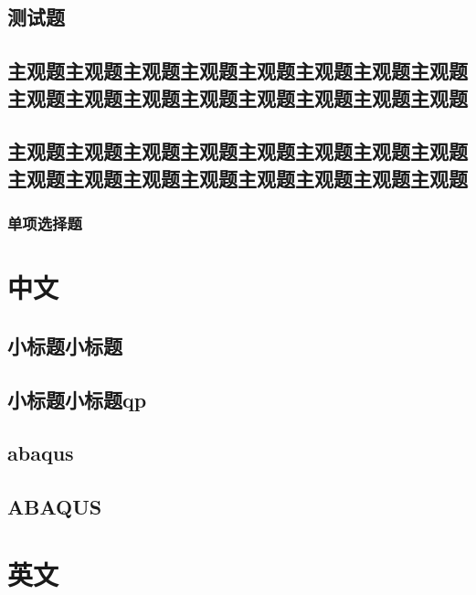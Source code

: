 \documentclass[color=green]{textbook-cn}%
\begin{document}
\begin{Test}
\chapter{测试题}


\begin{Definition}[定义名称]
	\lipsum[2]
\end{Definition}

\section{主观题主观题主观题主观题主观题主观题主观题主观题主观题主观题主观题主观题主观题主观题主观题主观题}


\section*{主观题主观题主观题主观题主观题主观题主观题主观题主观题主观题主观题主观题主观题主观题主观题主观题}


\subsection{单项选择题}

\lipsum

\end{Test}



\begin{Appendix}
\chapter[WWWW]{中文}

\section[子附录测试]{小标题小标题}
\section[子附录测试]{小标题小标题qp}

\section[子附录测试]{abaqus}

\section[子附录测试]{ABAQUS}


\zhlipsum
	
\chapter{英文}
\zhlipsum
\end{Appendix}
\end{document}
